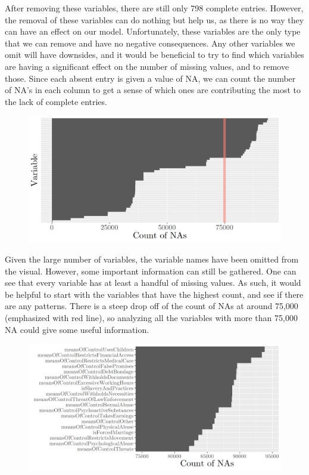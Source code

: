 \documentclass{article} %
\begin{document}
	After removing these variables, there are still only 798 complete entries. However, the removal of these variables can do nothing but help us, as there is no way they can have an effect on our model. Unfortunately, these variables are the only type that we can remove and have no negative consequences. Any other variables we omit will have downsides, and it would be beneficial to try to find which variables are having a significant effect on the number of missing values, and to remove those. Since each absent entry is given a value of NA, we can count the number of NA's in each column to get a sense of which ones are contributing the most to the lack of complete entries.
	
	\begin{figure}[H]
		\includegraphics[width = \textwidth]{NABarplot}
	\end{figure}
	
	Given the large number of variables, the variable names have been omitted from the visual. However, some important information can still be gathered. One can see that every variable has at least a handful of missing values. As such, it would be helpful to start with the variables that have the highest count, and see if there are any patterns. There is a steep drop off of the count of NAs at around 75,000 (emphasized with red line), so analyzing all the variables with more than 75,000 NA could give some useful information.
	
	\begin{figure}[H]
		\includegraphics[width = \textwidth]{NABarplot2}
	\end{figure}
	
\end{document}
